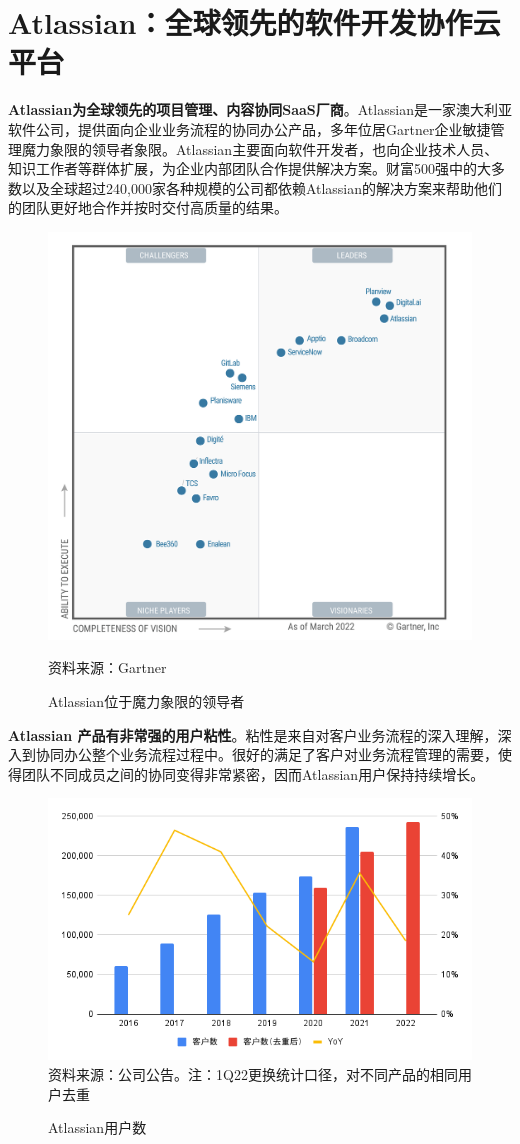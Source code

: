 \section{Atlassian：全球领先的软件开发协作云平台}

\textbf{Atlassian为全球领先的项目管理、内容协同SaaS厂商}。Atlassian是一家澳大利亚软件公司，提供面向企业业务流程的协同办公产品，多年位居Gartner企业敏捷管理魔力象限的领导者象限。Atlassian主要面向软件开发者，也向企业技术人员、知识工作者等群体扩展，为企业内部团队合作提供解决方案。财富500强中的大多数以及全球超过240,000家各种规模的公司都依赖Atlassian的解决方案来帮助他们的团队更好地合作并按时交付高质量的结果。
\begin{figure}[H]
    \caption{Atlassian位于魔力象限的领导者}
    \begin{center}
        \includegraphics[width=0.5\linewidth]{img/gartner.png}
    \end{center}
    \footnotesize{资料来源：Gartner}
\end{figure}

\textbf{Atlassian 产品有非常强的用户粘性}。粘性是来自对客户业务流程的深入理解，深入到协同办公整个业务流程过程中。很好的满足了客户对业务流程管理的需要，使得团队不同成员之间的协同变得非常紧密，因而Atlassian用户保持持续增长。
\begin{figure}[H]
    \caption{Atlassian用户数}
    \includegraphics[width=\linewidth]{img/customers.png}
    \footnotesize{资料来源：公司公告。注：1Q22更换统计口径，对不同产品的相同用户去重}
\end{figure}

